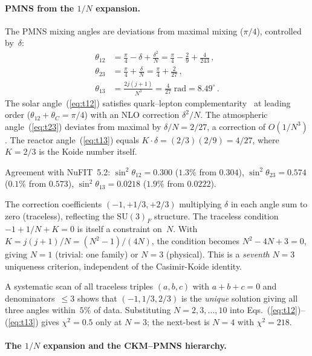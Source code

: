 \documentclass[aps,prd,twocolumn,showpacs,preprintnumbers,superscriptaddress]{revtex4-2}
\newcommand{\SU}{\mathrm{SU}}
\begin{document}
\paragraph{PMNS from the $1/N$ expansion.}

The PMNS mixing angles are deviations from maximal mixing
($\pi/4$), controlled by~$\delta$:
\begin{align}
  \theta_{12} &= \frac{\pi}{4} - \delta + \frac{\delta^2}{N}
  = \frac{\pi}{4} - \frac{2}{9} + \frac{4}{243}\,,
  \label{eq:t12}\\
  \theta_{23} &= \frac{\pi}{4} + \frac{\delta}{N}
  = \frac{\pi}{4} + \frac{2}{27}\,,
  \label{eq:t23}\\
  \theta_{13} &= \frac{2j(j+1)}{N^3} = \frac{4}{27}\;\text{rad}
  = 8.49^\circ\,.
  \label{eq:t13}
\end{align}
The solar angle~(\ref{eq:t12}) satisfies quark--lepton
complementarity~\cite{Raidal:2004} at leading order
($\theta_{12} + \theta_C = \pi/4$) with an NLO correction
$\delta^2/N$.
The atmospheric angle~(\ref{eq:t23}) deviates from maximal
by $\delta/N = 2/27$, a correction of $O(1/N^3)$.
The reactor angle~(\ref{eq:t13}) equals
$K \cdot \delta = (2/3)(2/9) = 4/27$, where $K = 2/3$ is
the Koide number itself.

Agreement with NuFIT~5.2:
$\sin^2\theta_{12} = 0.300$ ($1.3\%$ from $0.304$),
$\sin^2\theta_{23} = 0.574$ ($0.1\%$ from $0.573$),
$\sin^2\theta_{13} = 0.0218$ ($1.9\%$ from $0.0222$).

The correction coefficients $(-1, +1/3, +2/3)$ multiplying
$\delta$ in each angle sum to zero (traceless), reflecting
the $\SU(3)_F$ structure.
The traceless condition $-1 + 1/N + K = 0$ is itself a
constraint on~$N$.
With $K = j(j+1)/N = (N^2-1)/(4N)$, the condition becomes
$N^2 - 4N + 3 = 0$, giving $N = 1$ (trivial: one family) or
$N = 3$ (physical).
This is a \emph{seventh} $N = 3$ uniqueness criterion,
independent of the Casimir-Koide identity.

A systematic scan of all traceless triples $(a, b, c)$ with
$a + b + c = 0$ and denominators~$\leq 3$ shows that
$(-1, 1/3, 2/3)$ is the \emph{unique} solution giving all
three angles within~$5\%$ of data.
Substituting $N = 2, 3, \ldots, 10$ into
Eqs.~(\ref{eq:t12})--(\ref{eq:t13}) gives $\chi^2 = 0.5$
only at $N = 3$; the next-best is $N = 4$ with $\chi^2 = 218$.

\paragraph{The $1/N$ expansion and the CKM--PMNS hierarchy.}
\end{document}
